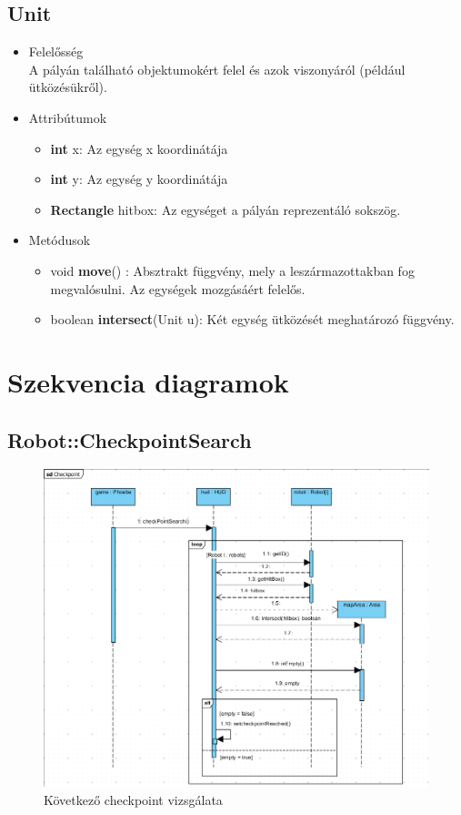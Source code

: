 \subsection{Unit}
\begin{itemize}
\item Felelősség\\
A pályán található objektumokért felel és azok viszonyáról (például ütközésükről).
\item Attribútumok
	\begin{itemize}
		\item \textbf{int} x: Az egység x koordinátája
		\item \textbf{int} y: Az egység y koordinátája
		\item \textbf{Rectangle} hitbox: Az egységet a pályán reprezentáló sokszög.
	\end{itemize}
\item Metódusok
	\begin{itemize}
		\item void \textbf{move}() : Absztrakt függvény, mely a leszármazottakban fog megvalósulni. Az egységek mozgásáért felelős.
		\item boolean \textbf{intersect}(Unit u): Két egység ütközését meghatározó függvény.
	\end{itemize}
\end{itemize}
\pagebreak

\section{Szekvencia diagramok}

\subsection{Robot::CheckpointSearch}
\begin{figure}[h]
\begin{center}
\includegraphics[width=17cm]{images/CheckpointSearch.PNG}
\caption{Következő checkpoint vizsgálata}
\label{fig:example2}
\end{center}
\end{figure}
\pagebreak

